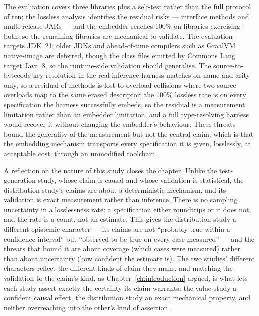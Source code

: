 The evaluation covers three libraries plus a self-test rather than the full
protocol of ten; the lossless analysis identifies the residual risks ---
interface methods and multi-release JARs --- and the embedder reaches 100\% on
libraries exercising both, so the remaining libraries are mechanical to validate.
The evaluation targets JDK~21; older JDKs and ahead-of-time compilers such as
GraalVM native-image are deferred, though the class files emitted by Commons Lang
target Java~8, so the runtime-side validation should generalise. The source-to-
bytecode key resolution in the real-inference harness matches on name and arity
only, so a residual of methods is lost to overload collisions where two source
overloads map to the same erased descriptor; the 100\% lossless rate is on every
specification the harness successfully embeds, so the residual is a measurement
limitation rather than an embedder limitation, and a full type-resolving harness
would recover it without changing the embedder's behaviour. These threats bound
the generality of the measurement but not the central claim, which is that the
embedding mechanism transports every specification it is given, losslessly, at
acceptable cost, through an unmodified toolchain.

A reflection on the nature of this study closes the chapter. Unlike the
test-generation study, whose claim is causal and whose validation is statistical,
the distribution study's claims are about a deterministic mechanism, and its
validation is exact measurement rather than inference. There is no sampling
uncertainty in a losslessness rate: a specification either roundtrips or it does
not, and the rate is a count, not an estimate. This gives the distribution study a
different epistemic character --- its claims are not ``probably true within a
confidence interval'' but ``observed to be true on every case measured'' --- and the
threats that bound it are about coverage (which cases were measured) rather than
about uncertainty (how confident the estimate is). The two studies' different
characters reflect the different kinds of claim they make, and matching the
validation to the claim's kind, as Chapter~\ref{ch:introduction} argued, is what
lets each study assert exactly the certainty its claim warrants: the value study a
confident causal effect, the distribution study an exact mechanical property, and
neither overreaching into the other's kind of assertion.
